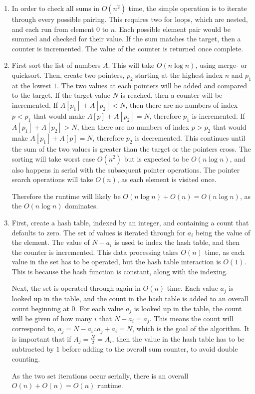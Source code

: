 \documentclass{article}
\begin{document}
\begin{enumerate}
    \item In order to check all sums in $O(n^2)$ time, the simple operation is to iterate through every possible pairing.
        This requires two for loops, which are nested, and each run from element $0$ to $n$.
        Each possible element pair would be summed and checked for their value.
        If the sum matches the target, then a counter is incremented. The value of the counter is returned once complete.

    \item First sort the list of numbers $A$. This will take $O(n\log n)$, using merge- or quicksort.
        Then, create two pointers, $p_2$ starting at the highest index $n$ and $p_1$ at the lowest $1$.
        The two values at each pointers will be added and compared to the target.
        If the target value $N$ is reached, then a counter will be incremented.
        If $A[p_1]+A[p_2]<N$, then there are no numbers of index $p<p_1$ that would make $A[p]+A[p_2]=N$,
        therefore $p_1$ is incremented.
        If $A[p_1]+A[p_2]>N$, then there are no numbers of index $p>p_2$ that would make $A[p_1]+A[p]=N$,
        therefore $p_2$ is decremented.
        This continues until the sum of the two values is greater than the target or the pointers cross.
        The sorting will take worst case $O(n^2)$ but is expected to be $O(n\log n)$,
        and also happens in serial with the subsequent pointer operations.
        The pointer search operations will take $O(n)$, as each element is visited once.

        Therefore the runtime will likely be $O(n\log n) + O(n) = O(n\log n)$, as the $O(n\log n)$ dominates.

    \item First, create a hash table, indexed by an integer, and containing a count that defaults to zero.
        The set of values is iterated through for $a_i$ being the value of the element.
        The value of $N-a_i$ is used to index the hash table, and then the counter is incremented.
        This data processing takes $O(n)$ time, as each value in the set has to be operated,
        but the hash table interaction is $O(1)$.
        This is because the hash function is constant, along with the indexing.
        
        Next, the set is operated through again in $O(n)$ time. Each value $a_j$ is looked up in the table,
        and the count in the hash table is added to an overall count beginning at $0$.
        For each value $a_j$ is looked up in the table, the count will be given of how many $i$ that $N-a_i=a_j$.
        This means the count will correspond to, $a_j=N-a_i \therefore a_j+a_i=N$, which is the goal of the algorithm.
        It is important that if $A_j = \frac{N}{2} = A_i$, then the value in the hash table has to be subtracted by $1$ before adding to the overall sum counter, to avoid double counting.
        
        As the two set iterations occur serially, there is an overall $O(n) + O(n) = O(n)$ runtime.
\end{enumerate}
\end{document}
